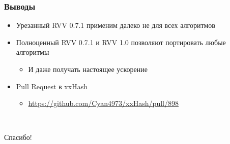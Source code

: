 \documentclass[
    aspectratio=169,
]{beamer}
\begin{document}
\begin{frame}
    \frametitle{Выводы}

    \begin{itemize}
        \item Урезанный RVV 0.7.1 применим далеко не для всех алгоритмов
        \item Полноценный RVV 0.7.1 и RVV 1.0 позволяют портировать любые алгоритмы
              \begin{itemize}
                  \item И даже получать настоящее ускорение
              \end{itemize}
        \item Pull Request в xxHash
              \begin{itemize}
                  \item \url{https://github.com/Cyan4973/xxHash/pull/898}
              \end{itemize}
    \end{itemize}

    \ %

    \begin{center}
        \Huge  Спасибо!
    \end{center}
\end{frame}
\end{document}
